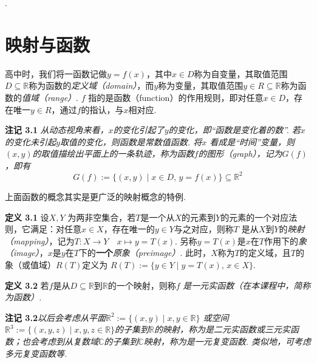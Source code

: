 \documentclass{article}
\begin{document}
\vspace{3pt}

\qquad {}.



\newpage

\section{映射与函数}

高中时，我们将一函数记做$y=f(x)$，其中$x\in D$称为自变量，其取值范围$D\subseteq\mathbb{R}$称为函数的\textit{定义域（domain）}，而$y$称为变量，其取值范围$y\in R\subseteq \mathbb{R}$称为函数的\textit{值域（range）}. $f$ 指的是函数（function）的作用规则，即对任意$x\in D$，存在唯一$y\in R$，通过$f$的指认，与$x$相对应. 

\vspace{4pt}

\textbf{注记 3.1} \textit{从动态视角来看，$x$的变化引起了$y$的变化，即“函数是变化着的数”. 若$x$的变化未引起$y$取值的变化，则函数是常数值函数. 将$x$ 看成是“时间”变量，则$(x,y)$的取值描绘出平面上的一条轨迹，称为函数$f$的图形（graph），记为$G(f)$，即有}\[G(f):=\{(x,y)\mid x\in D,\,y=f(x)\}\subseteq \mathbb{R}^{2}\]

上面函数的概念其实是更广泛的映射概念的特例.

\vspace{4pt}

\textbf{定义 3.1} 设$X, Y$ 为两非空集合，若$T$是一个从$X$的元素到$Y$的元素的一个对应法则，它满足：对任意$x\in X$，存在唯一的$y\in Y$与之对应，则称$T$ 是从$X$到$Y$的\textit{映射（mapping）}，记为$T: X\longrightarrow Y\quad x\longmapsto y=T(x)$. 另称$y=T(x)$是$x$在$T$作用下的\textit{象（image）}，$x$是$y$在$T$下的\textbf{一个}\textit{原象（preimage）}. 此时，$X$称为$T$的定义域，且$T$的象（或值域）$R(T)$定义为 $R(T):=\{y\in Y\mid y=T(x), \,x\in X\}$.

\vspace{4pt}

\textbf{定义 3.2} 若$f$是从$D\subseteq \mathbb{R}$到$\mathbb{R}$的一个映射，则称$f$ \textit{是一元实函数（在本课程中，简称为函数）.} 

\vspace{3pt}

\textbf{注记 3.2}\textit{以后会考虑从平面$\mathbb{R}^{2}:=\{(x,y)\mid x,y\in\mathbb{R}\}$ 或空间$\mathbb{R}^{3}:=\{(x,y,z)\mid x,y,z\in\mathbb{R}\}$的子集到$\mathbb{R}$的映射，称为是二元实函数或三元实函数；也会考虑到从复数域$\mathbb{C}$的子集到$\mathbb{C}$映射，称为是一元复变函数. 类似地，可考虑多元复变函数等. }
\end{document}
